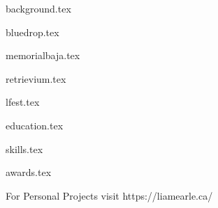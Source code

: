 \documentclass[11pt]{article}
\begin{document}
{background.tex}


{bluedrop.tex}

{memorialbaja.tex}

{retrievium.tex}

{lfest.tex}


{education.tex}


{skills.tex}


{awards.tex}

{For Personal Projects visit https://liamearle.ca/}
\end{document}
